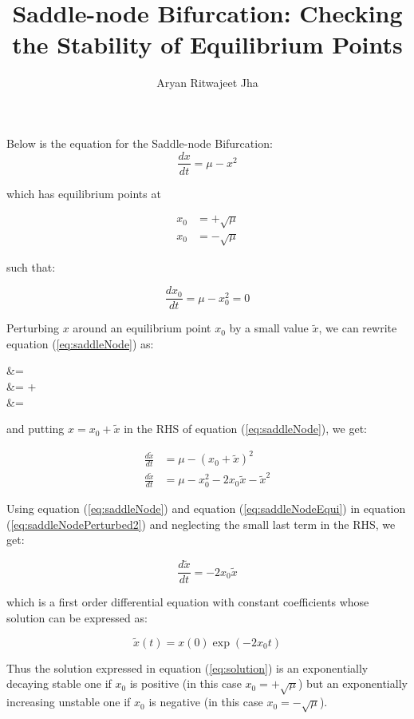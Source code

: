 \documentclass{article}
\begin{document}
	\title{Saddle-node Bifurcation: Checking the Stability of Equilibrium Points}
	\author{Aryan Ritwajeet Jha}
	\maketitle
	
Below is the equation for the Saddle-node Bifurcation: 
	\begin{equation}
		\label{eq:saddleNode}
		\frac{dx}{dt} = \mu - x^2
	\end{equation}
	
which has equilibrium points at
	
	\begin{align*}
		x_0 &= +\sqrt\mu \\
		x_0 &= -\sqrt\mu
	\end{align*} 

such that:
	
	\begin{equation}
		\label{eq:saddleNodeEqui}
		\frac{dx_0}{dt} = \mu - x_0^2 = 0 
	\end{equation}
	
	
Perturbing $x$ around an equilibrium point $x_0$ by a small value $\tilde x$, we can rewrite equation (\ref{eq:saddleNode}) as:
	
	\begin{align[1]}
		\label{eq:saddleNodePerturbed}
		 &=  \\
		 &=  +  \\
		 &=  
	\end{align[1]}
and putting $x = x_0 + \tilde x$ in the RHS of equation (\ref{eq:saddleNode}), we get:
	
	\begin{align}
		\label{eq:saddleNodePerturbed2}
		\frac{d\tilde x}{dt} &= \mu - (x_0+\tilde x)^2 \\
		\frac{d\tilde x}{dt} &= \mu - x_0^2 -2x_0\tilde x - \tilde x^2
	\end{align}
	
Using equation (\ref{eq:saddleNode}) and equation (\ref{eq:saddleNodeEqui}) in equation (\ref{eq:saddleNodePerturbed2}) and neglecting the small last term in the RHS, we get:
	
	\begin{equation}
		\frac{d\tilde x}{dt} = -2x_0\tilde x
	\end{equation}

which is a first order differential equation with constant coefficients whose solution can be expressed as:

	\begin{equation}
		\label{eq:solution}
		\tilde{x}(t) = x(0)\exp{(-2x_0t)} 
	\end{equation}

Thus the solution expressed in equation (\ref{eq:solution}) is an exponentially decaying stable one if $x_0$ is positive (in this case $x_0 = +\sqrt{\mu}$) but an exponentially increasing unstable one if $x_0$ is negative (in this case $x_0 = -\sqrt{\mu}$).
\end{document}
